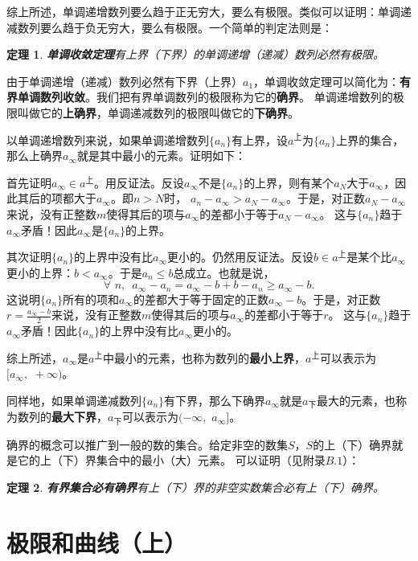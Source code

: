 \documentclass[12pt,UTF8]{ctexbook}
\newtheorem{tm}{定理}[section]
\begin{document}
综上所述，单调递增数列要么趋于正无穷大，要么有极限。类似可以证明：单调递减数列要么趋于负无穷大，要么有极限。一个简单的判定法则是：
\begin{tm}\textbf{单调收敛定理}\label{tm:2-2-0}
    有上界（下界）的单调递增（递减）数列必然有极限。
\end{tm}
由于单调递增（递减）数列必然有下界（上界）$a_1$，单调收敛定理可以简化为：\textbf{有界单调数列收敛}。我们把有界单调数列的极限称为它的\textbf{确界}。
单调递增数列的极限叫做它的\textbf{上确界}，单调递减数列的极限叫做它的\textbf{下确界}。

以单调递增数列来说，如果单调递增数列$\{a_n\}$有上界，设$a^{\text{上}}$为$\{a_n\}$上界的集合，那么上确界$a_\infty$就是其中最小的元素。证明如下：

首先证明$a_\infty \in a^{\text{上}}$。用反证法。反设$a_\infty$不是$\{a_n\}$的上界，则有某个$a_N$大于$a_\infty$，因此其后的项都大于$a_\infty$。即$n > N$时，
$a_n - a_\infty > a_N - a_\infty$。于是，对正数$a_N - a_\infty$来说，没有正整数$m$使得其后的项与$a_\infty$的差都小于等于$a_N - a_\infty$。
这与$\{a_n\}$趋于$a_\infty$矛盾！因此$a_\infty$是$\{a_n\}$的上界。

其次证明$\{a_n\}$的上界中没有比$a_\infty$更小的。仍然用反证法。反设$b \in a^{\text{上}}$是某个比$a_\infty$更小的上界：$b < a_\infty$。于是$a_n \leqslant b$总成立。也就是说，
$$\forall \,\, n, \,\,\, a_\infty - a_n = a_\infty - b + b - a_n \geqslant a_\infty - b.$$
这说明$\{a_n\}$所有的项和$a_\infty$的差都大于等于固定的正数$a_\infty - b$。于是，对正数$r = \frac{a_\infty - b}{2}$来说，没有正整数$m$使得其后的项与$a_\infty$的差都小于等于$r$。
这与$\{a_n\}$趋于$a_\infty$矛盾！因此$\{a_n\}$的上界中没有比$a_\infty$更小的。

综上所述，$a_\infty$是$a^{\text{上}}$中最小的元素，也称为数列的\textbf{最小上界}，$a^{\text{上}}$可以表示为$[a_\infty, \,\,+\infty)$。

同样地，如果单调递减数列$\{a_n\}$有下界，那么下确界$a_\infty$就是$a_{\text{下}}$最大的元素，也称为数列的\textbf{最大下界}，$a_{\text{下}}$可以表示为$(-\infty,\,\,a_\infty]$。 

确界的概念可以推广到一般的数的集合。给定非空的数集$S$，$S$的上（下）确界就是它的上（下）界集合中的最小（大）元素。
可以证明（见附录$B.1$）：
\begin{tm}{\textbf{有界集合必有确界}}\label{tm:2-2-10}
    有上（下）界的非空实数集合必有上（下）确界。
\end{tm}

\section{极限和曲线（上）}
\end{document}
